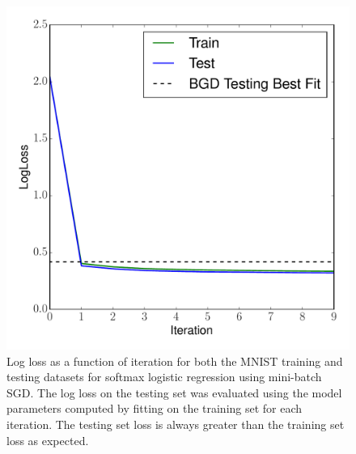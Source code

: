 \documentclass[12pt]{amsart}
\begin{document}
\begin{figure}[H]
	\includegraphics[width=\columnwidth]{sgd_mini_mnist_multi_train_test_ll.pdf}
    \caption{Log loss as a function of iteration for both the MNIST training and testing datasets for softmax logistic regression using mini-batch SGD.  The log loss on the testing set was evaluated using the model parameters computed by fitting on the training set for each iteration.  The testing set loss is always greater than the training set loss as expected.}
    \label{fig:sgd_mini_mnist_ll}
\end{figure}
\end{document}
